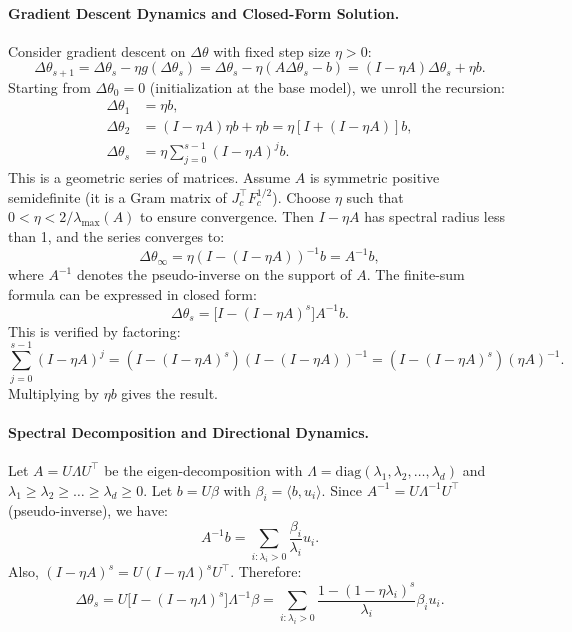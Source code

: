 \documentclass{llmxive}
\begin{document}
\paragraph{Gradient Descent Dynamics and Closed-Form Solution.}
Consider gradient descent on \(\Delta\theta\) with fixed step size \(\eta > 0\):
\begin{equation}
\Delta\theta_{s+1} = \Delta\theta_s - \eta g(\Delta\theta_s) = \Delta\theta_s - \eta (A\Delta\theta_s - b) = (I - \eta A)\Delta\theta_s + \eta b.
\end{equation}
Starting from \(\Delta\theta_0 = 0\) (initialization at the base model), we unroll the recursion:
\begin{align}
\Delta\theta_1 &= \eta b, \\
\Delta\theta_2 &= (I - \eta A)\eta b + \eta b = \eta[I + (I - \eta A)] b, \\
\Delta\theta_s &= \eta \sum_{j=0}^{s-1} (I - \eta A)^{j} b.
\end{align}
This is a geometric series of matrices. Assume \(A\) is symmetric positive semidefinite (it is a Gram matrix of \(J_c^{\top}F_c^{1/2}\)). Choose \(\eta\) such that \(0<\eta < 2/\lambda_{\max}(A)\) to ensure convergence. Then \(I - \eta A\) has spectral radius less than 1, and the series converges to:
\begin{equation}
\Delta\theta_{\infty} = \eta (I - (I - \eta A))^{-1} b = A^{-1} b,
\end{equation}
where \(A^{-1}\) denotes the pseudo-inverse on the support of \(A\). The finite-sum formula can be expressed in closed form:
\begin{equation}
\Delta\theta_s = \big[ I - (I - \eta A)^s \big] A^{-1} b.
\end{equation}
This is verified by factoring:
\begin{equation}
\sum_{j=0}^{s-1} (I - \eta A)^j = (I - (I - \eta A)^s)(I - (I - \eta A))^{-1} = (I - (I - \eta A)^s)(\eta A)^{-1}.
\end{equation}
Multiplying by \(\eta b\) gives the result.

\paragraph{Spectral Decomposition and Directional Dynamics.}
Let \(A = U \Lambda U^{\top}\) be the eigen-decomposition with \(\Lambda = \mathrm{diag}(\lambda_1,\lambda_2,\dots,\lambda_d)\) and \(\lambda_1 \ge \lambda_2 \ge \dots \ge \lambda_d \ge 0\).  
Let \(b = U \beta\) with \(\beta_i = \langle b, u_i \rangle\). Since \(A^{-1} = U \Lambda^{-1} U^{\top}\) (pseudo-inverse), we have:
\begin{equation}
A^{-1}b = \sum_{i: \lambda_i>0} \frac{\beta_i}{\lambda_i} u_i.
\end{equation}
Also, \((I - \eta A)^s = U (I - \eta \Lambda)^s U^{\top}\). Therefore:
\begin{equation}
\Delta\theta_s = U \big[ I - (I - \eta \Lambda)^s \big] \Lambda^{-1} \beta = \sum_{i: \lambda_i>0} \frac{1 - (1 - \eta \lambda_i)^s}{\lambda_i} \beta_i u_i.
\end{equation}
\end{document}

